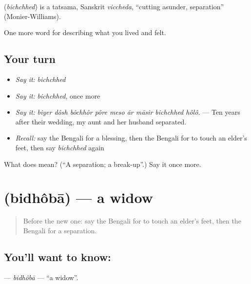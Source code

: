 \begin{cousinweb}
\textbf{} (\emph{bichchhed}) is a tatsama, Sanskrit \emph{viccheda}, \textquotedblleft{}cutting asunder, separation\textquotedblright{} (Monier-Williams).
\end{cousinweb}

\begin{grammarlens}[title={What you've built}]
One more word for describing what you lived and felt.
\end{grammarlens}

\subsection*{Your turn}
\begin{itemize}
\raggedright
  \item \emph{Say it:} \emph{bichchhed}
  \item \emph{Say it:} \emph{bichchhed}, once more
  \item \emph{Say it:} \emph{biyer dôsh bôchhôr pôre meso ār māsir bichchhed hôlô.} — Ten years after their wedding, my aunt and her husband separated.
  \item \emph{Recall:} say the Bengali for a blessing, then the Bengali for to touch an elder's feet, then say \emph{bichchhed} again
\end{itemize}

\begin{tcolorbox}[breakable,colback=teal!4,colframe=teal!35!black,title={Before you move on}]
What does  mean? (\textquotedblleft{}A separation; a break-up\textquotedblright{}.) Say it once more.
\end{tcolorbox}
\section[\texorpdfstring{\bn{বিধবা} (bidhôbā)}{বিধবা (bidhôbā)}]{ (bidhôbā) — a widow}

\label{lesson:BN-C490-bidhoba}



\begin{quote}
Before the new one: say the Bengali for to touch an elder's feet, then the Bengali for a separation.
\end{quote}

\subsection*{You'll want to know: }
\textbf{} — \emph{bidhôbā} — \textquotedblleft{}a widow\textquotedblright{}.

